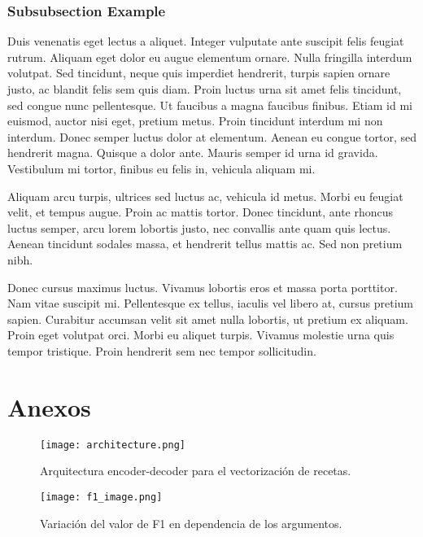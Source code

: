 \documentclass[
	a4paper, %
	10pt, %
	unnumberedsections, %
	twoside, %
]{LTJournalArticle}
\begin{document}
\subsubsection{Subsubsection Example}

Duis venenatis eget lectus a aliquet. Integer vulputate ante suscipit felis feugiat rutrum. Aliquam eget dolor eu augue elementum ornare. Nulla fringilla interdum volutpat. Sed tincidunt, neque quis imperdiet hendrerit, turpis sapien ornare justo, ac blandit felis sem quis diam. Proin luctus urna sit amet felis tincidunt, sed congue nunc pellentesque. Ut faucibus a magna faucibus finibus. Etiam id mi euismod, auctor nisi eget, pretium metus. Proin tincidunt interdum mi non interdum. Donec semper luctus dolor at elementum. Aenean eu congue tortor, sed hendrerit magna. Quisque a dolor ante. Mauris semper id urna id gravida. Vestibulum mi tortor, finibus eu felis in, vehicula aliquam mi.

Aliquam arcu turpis, ultrices sed luctus ac, vehicula id metus. Morbi eu feugiat velit, et tempus augue. Proin ac mattis tortor. Donec tincidunt, ante rhoncus luctus semper, arcu lorem lobortis justo, nec convallis ante quam quis lectus. Aenean tincidunt sodales massa, et hendrerit tellus mattis ac. Sed non pretium nibh. 

Donec cursus maximus luctus. Vivamus lobortis eros et massa porta porttitor. Nam vitae suscipit mi. Pellentesque ex tellus, iaculis vel libero at, cursus pretium sapien. Curabitur accumsan velit sit amet nulla lobortis, ut pretium ex aliquam. Proin eget volutpat orci. Morbi eu aliquet turpis. Vivamus molestie urna quis tempor tristique. Proin hendrerit sem nec tempor sollicitudin.


\printbibliography %


\section{Anexos}

\begin{figure*}
	\texttt{[image: architecture.png]}
	\caption{Arquitectura encoder-decoder para el vectorización de recetas.}
	\label{fig:encoder_decoder}
\end{figure*}


\begin{figure}
	\texttt{[image: f1\_image.png]}
	\caption{Variación del valor de F1 en dependencia de los argumentos.}
	\label{fig:f1_plot}
\end{figure}
\end{document}
